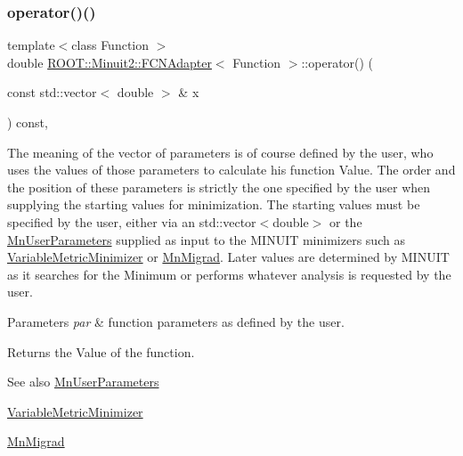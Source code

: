 \subsubsection{\texorpdfstring{operator()()}{operator()()}\hspace{0.1cm}{\footnotesize\ttfamily [1/6]}}
{\footnotesize\ttfamily template$<$class Function $>$ \\
double \mbox{\hyperlink{classROOT_1_1Minuit2_1_1FCNAdapter}{R\+O\+O\+T\+::\+Minuit2\+::\+F\+C\+N\+Adapter}}$<$ Function $>$\+::operator() (\begin{DoxyParamCaption}\item[{const std\+::vector$<$ double $>$ \&}]{x }\end{DoxyParamCaption}) const\hspace{0.3cm}{\ttfamily [inline]}, {\ttfamily [virtual]}}

The meaning of the vector of parameters is of course defined by the user, who uses the values of those parameters to calculate his function Value. The order and the position of these parameters is strictly the one specified by the user when supplying the starting values for minimization. The starting values must be specified by the user, either via an std\+::vector$<$double$>$ or the \mbox{\hyperlink{classROOT_1_1Minuit2_1_1MnUserParameters}{Mn\+User\+Parameters}} supplied as input to the M\+I\+N\+U\+IT minimizers such as \mbox{\hyperlink{classROOT_1_1Minuit2_1_1VariableMetricMinimizer}{Variable\+Metric\+Minimizer}} or \mbox{\hyperlink{classROOT_1_1Minuit2_1_1MnMigrad}{Mn\+Migrad}}. Later values are determined by M\+I\+N\+U\+IT as it searches for the Minimum or performs whatever analysis is requested by the user.


\begin{DoxyParams}{Parameters}
{\em par} & function parameters as defined by the user.\\
\hline
\end{DoxyParams}
\begin{DoxyReturn}{Returns}
the Value of the function.
\end{DoxyReturn}
\begin{DoxySeeAlso}{See also}
\mbox{\hyperlink{classROOT_1_1Minuit2_1_1MnUserParameters}{Mn\+User\+Parameters}} 

\mbox{\hyperlink{classROOT_1_1Minuit2_1_1VariableMetricMinimizer}{Variable\+Metric\+Minimizer}} 

\mbox{\hyperlink{classROOT_1_1Minuit2_1_1MnMigrad}{Mn\+Migrad}} 
\end{DoxySeeAlso}


